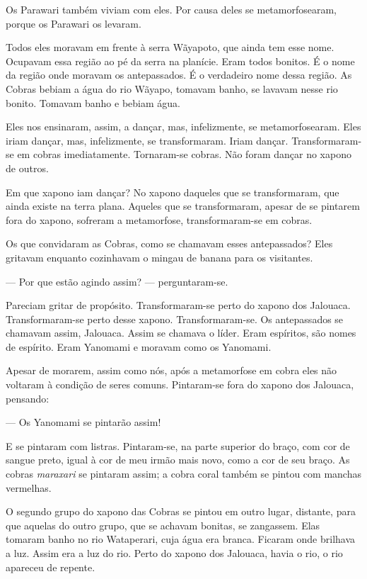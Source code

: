 Os Parawari também viviam com eles. Por causa deles se metamorfosearam,
porque os Parawari os levaram. 

Todos eles moravam em frente à serra Wãyapoto, que ainda tem esse nome.
Ocupavam essa região ao pé da serra na planície. Eram todos bonitos. É o
nome da região onde moravam os antepassados. É o verdadeiro nome dessa
região. As Cobras bebiam a água do rio Wãyapo, tomavam banho, se lavavam
nesse rio bonito. Tomavam banho e bebiam água. 

Eles nos ensinaram, assim, a dançar, mas, infelizmente, se
metamorfosearam. Eles iriam dançar, mas, infelizmente, se transformaram.
Iriam dançar. Transformaram-se em cobras imediatamente. Tornaram-se
cobras. Não foram dançar no xapono de outros. 

Em que xapono iam dançar? No xapono daqueles que se transformaram, que ainda existe na terra plana. Aqueles que se transformaram, apesar de se
pintarem fora do xapono, sofreram a metamorfose, transformaram-se em
cobras. 

Os que convidaram as Cobras, como se chamavam esses antepassados? Eles
gritavam enquanto cozinhavam o mingau de banana para os visitantes. 

--- Por que estão agindo assim? --- perguntaram-se.

Pareciam gritar de propósito. Transformaram-se perto do xapono dos
Jalouaca. Transformaram-se perto desse xapono. Transformaram-se. Os
antepassados se chamavam assim, Jalouaca. Assim se chamava o líder. Eram
espíritos, são nomes de espírito. Eram Yanomami e moravam como os
Yanomami. 

Apesar de morarem, 
assim como nós, após a metamorfose em cobra eles não
voltaram à condição de seres comuns. Pintaram-se fora do xapono dos
Jalouaca, pensando: 

--- Os Yanomami se pintarão assim! 

E se pintaram com listras. Pintaram-se, na parte superior do braço, com
cor de sangue preto, igual à cor de meu irmão mais novo, como a cor de
seu braço. As cobras \textit{maraxari} se pintaram assim; a cobra coral
também se pintou com manchas vermelhas. 

O segundo grupo do xapono das Cobras se pintou em outro lugar, distante,
para que aquelas do outro grupo, que se achavam bonitas, se zangassem.
Elas tomaram banho no rio Wataperari, cuja água era branca. Ficaram onde
brilhava a luz. Assim era a luz do rio. Perto do xapono dos Jalouaca,
havia o rio, o rio apareceu de repente. 

